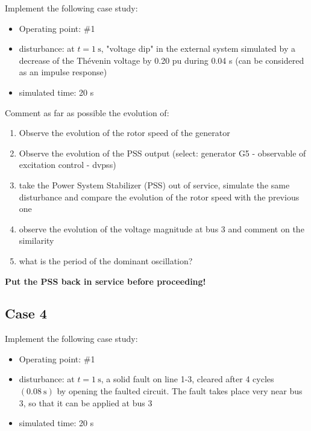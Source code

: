 \documentclass[a4paper,11pt,oneside,onecolumn]{article}
\begin{document}
Implement the following case study:
\begin{itemize}
\item Operating point: \#1
\item disturbance: at $t=1 \mathrm{~s}$, "voltage dip" in the external system simulated by a decrease of the Thévenin voltage by 0.20 pu during 0.04 s (can be considered as an impulse response)
\item simulated time: 20 s
\end{itemize}

\noindent Comment as far as possible the evolution of:
\begin{enumerate}
\item Observe the evolution of the rotor speed of the generator
\item Observe the evolution of the PSS output (select: generator G5 - observable of excitation control - dvpss)
\item take the Power System Stabilizer (PSS) out of service, simulate the same disturbance and compare the evolution of the rotor speed with the previous one
\item observe the evolution of the voltage magnitude at bus 3 and comment on the similarity
\item what is the period of the dominant oscillation?
	
\end{enumerate}

\noindent \textbf{Put the PSS back in service before proceeding!}

\subsection{Case 4}

Implement the following case study:
\begin{itemize}
\item Operating point: \#1
\item disturbance: at $t=1 \mathrm{~s}$, a solid fault on line 1-3, cleared after 4 cycles $(0.08 \mathrm{~s})$ by opening the faulted circuit. The fault takes place very near bus 3, so that it can be applied at bus 3
\item simulated time: 20 s
\end{itemize}
\end{document}
